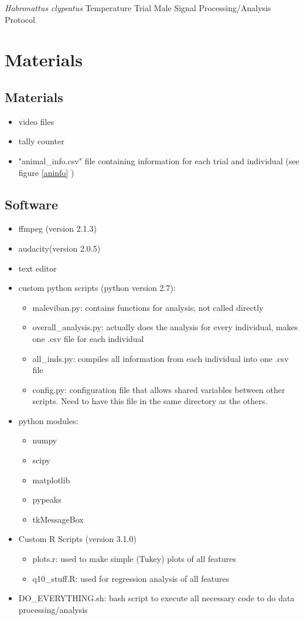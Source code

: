 \documentclass[11 pt]{article}
\begin{document}
{\large \centerline{\emph{Habronattus clypeatus} Temperature Trial Male Signal Processing/Analysis Protocol}}
\section{Materials}
\subsection{Materials}
\begin{itemize}
\item{video files}
\item{tally counter}
\item "animal\_info.csv" file containing information for each trial and individual (see figure \ref{aninfo} )
\end{itemize}
\subsection{Software}
\begin{itemize}
\item{ffmpeg (version 2.1.3)}
\item{audacity(version 2.0.5)}
\item {text editor}
\item custom python scripts (python version 2.7):
\begin{itemize}
\item maleviban.py: contains functions for analysis; not called directly
\item overall\_analysis.py: actually does the analysis for every individual, makes one .csv file for each individual
\item all\_inds.py: compiles all information from each individual into one .csv file
\item config.py: configuration file that allows shared variables between other scripts.  Need to have this file in the same directory as the others.
\end{itemize}
\item python modules:
\begin{itemize}
\item numpy
\item scipy
\item matplotlib
\item pypeaks
\item tkMessageBox
\end{itemize}
\item Custom R Scripts (version 3.1.0)
\begin{itemize}
\item plots.r: used to make simple (Tukey) plots of all features
\item q10\_stuff.R: used for regression analysis of all features
\end{itemize}
\item DO\_EVERYTHING.sh: bash script to execute all necessary code to do data processing/analysis
\end{itemize}
\end{document}
